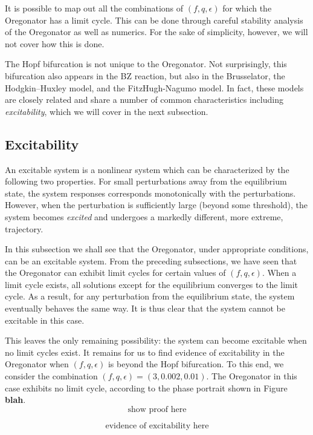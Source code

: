 \documentclass[twocolumn,amsmath,amssymb,aps]{revtex4}
\begin{document}
It is possible to map out all the combinations of $(f,q,\epsilon)$ for which the Oregonator has a limit cycle. This can be done through careful stability analysis of the Oregonator as well as numerics. For the sake of simplicity, however, we will not cover how this is done.


The Hopf bifurcation is not unique to the Oregonator. Not surprisingly, this bifurcation also appears in the BZ reaction, but also in the Brusselator, the Hodgkin–Huxley model, and the FitzHugh-Nagumo model. In fact, these models are closely related and share a number of common characteristics including \textit{excitability}, which we will cover in the next subsection.


\subsection{Excitability}
An excitable system is a nonlinear system which can be characterized by the following two properties. For small perturbations away from the equilibrium state, the system responses corresponds monotonically with the perturbations.  However, when the perturbation is sufficiently large (beyond some threshold), the system becomes \textit{excited} and undergoes a markedly different, more extreme, trajectory.  

In this subsection we shall see that the Oregonator, under appropriate conditions, can be an excitable system. From the preceding subsections, we have seen that the Oregonator can exhibit limit cycles for certain values of $(f,q,\epsilon)$. When a limit cycle exists, all solutions except for the equilibrium converges to the limit cycle. As a result, for any perturbation from the equilibrium state, the system eventually behaves the same way. It is thus clear that the system cannot be excitable in this case. 

This leaves the only remaining possibility: the system  can become excitable when no limit cycles exist. It remains for us to find evidence of excitability in the Oregonator when $(f,q,\epsilon)$ is beyond the Hopf bifurcation. To this end, we consider the combination $(f,q,\epsilon) = (3,0.002, 0.01)$. The Oregonator in this case exhibits no limit cycle, according to the phase portrait shown in Figure \textbf{blah}.
\begin{equation}
\text{show proof here}
\end{equation}

\begin{equation}
\text{evidence of excitability here}
\end{equation}
\end{document}
